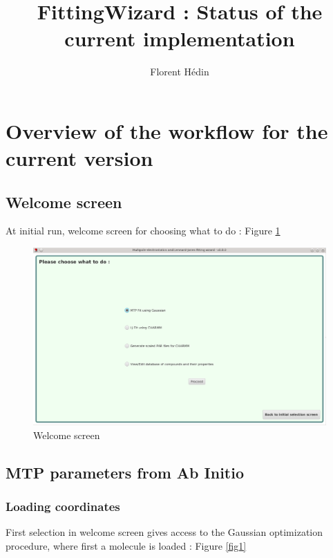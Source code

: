 \documentclass[12pt,a4paper]{article}
\author{Florent Hédin}
\title{FittingWizard : Status of the current implementation}
\begin{document}
\maketitle

\tableofcontents

\section{Overview of the workflow for the current version}

\subsection{Welcome screen}

At initial run, welcome screen for choosing what to do : Figure \ref{fig0} \\


\begin{figure}[h!]
\centering
\includegraphics[width=0.9\linewidth]{pics/scr0}
\caption{Welcome screen}
\label{fig0}
\end{figure}

\subsection{MTP parameters from Ab Initio}

\subsubsection{Loading coordinates}

First selection in welcome screen gives access to the Gaussian optimization procedure, where first 
a molecule 
is loaded : Figure \ref{fig1} \\
\end{document}
